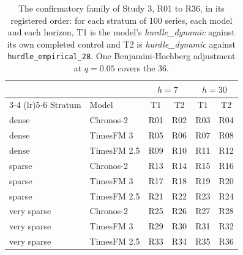 \begin{table}[t]
\centering\small
\caption{The confirmatory family of Study 3, R01 to R36, in its registered order: for each stratum of 100
series, each model and each horizon, T1 is the model's \emph{hurdle\_dynamic} against its own completed
control and T2 is \emph{hurdle\_dynamic} against \texttt{hurdle\_empirical\_28}. One Benjamini-Hochberg
adjustment at $q = 0.05$ covers the 36.}
\label{tab:s3structure}
\begin{tabular}{llcccc}
\toprule
 & & \multicolumn{2}{c}{$h = 7$} & \multicolumn{2}{c}{$h = 30$} \\
\cmidrule(lr){3-4} \cmidrule(lr){5-6}
Stratum & Model & T1 & T2 & T1 & T2 \\
\midrule
dense & Chronos-2 & R01 & R02 & R03 & R04 \\
dense & TimesFM 3 & R05 & R06 & R07 & R08 \\
dense & TimesFM 2.5 & R09 & R10 & R11 & R12 \\
sparse & Chronos-2 & R13 & R14 & R15 & R16 \\
sparse & TimesFM 3 & R17 & R18 & R19 & R20 \\
sparse & TimesFM 2.5 & R21 & R22 & R23 & R24 \\
very sparse & Chronos-2 & R25 & R26 & R27 & R28 \\
very sparse & TimesFM 3 & R29 & R30 & R31 & R32 \\
very sparse & TimesFM 2.5 & R33 & R34 & R35 & R36 \\
\bottomrule
\end{tabular}
\end{table}
